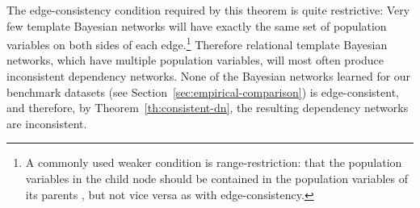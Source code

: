 \documentclass[runningheads,a4paper]{llncs}
\begin{document}

%

The edge-consistency condition required by this theorem is quite restrictive: Very few template Bayesian networks will have exactly the same set of population variables on both sides of each edge.\footnote{A commonly used weaker condition is range-restriction: that the population variables in the child node should be contained in the population variables of its parents \cite{Kersting2007}, but not vice versa as with edge-consistency.}
%
%
Therefore relational template Bayesian networks, which have multiple population variables, will most often produce inconsistent dependency networks. None of the Bayesian networks learned for our benchmark datasets (see Section~\ref{sec:empirical-comparison}) is edge-consistent, and therefore, by Theorem~\ref{th:consistent-dn},  the resulting dependency networks are inconsistent.
\end{document}
